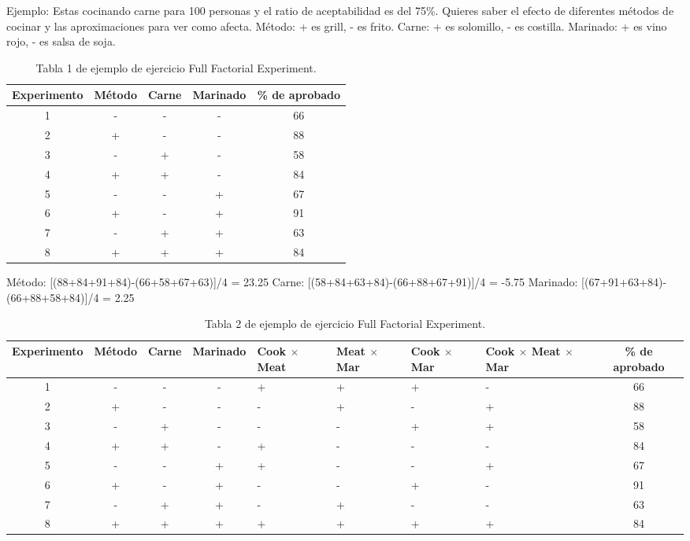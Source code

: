 \documentclass[]{article}
\begin{document}
Ejemplo: Estas cocinando carne para 100 personas y el ratio de aceptabilidad es del 75\%. Quieres saber el efecto de diferentes métodos de cocinar y las aproximaciones para ver como afecta.
Método: + es grill, - es frito. Carne: + es solomillo, - es costilla. Marinado: + es vino rojo, - es salsa de soja.

\begin{table}[H]
	\begin{center}
\begin{tabular}{|c|c|c|c|c|}
	\hline Experimento & Método & Carne & Marinado & \% de aprobado \\ 
	\hline 1 & - & - & - & 66 \\ 
	\hline 2 & + & - & - & 88 \\ 
	\hline 3 & - & + & - & 58 \\ 
	\hline 4 & + & + & - & 84 \\ 
	\hline 5 & - & - & + & 67 \\ 
	\hline 6 & + & - & + & 91 \\ 
	\hline 7 & - & + & + & 63 \\ 
	\hline 8 & + & + & + & 84 \\ 
	\hline 
\end{tabular} 
		\caption{Tabla 1 de ejemplo de ejercicio Full Factorial Experiment.}
		\end{center}
\end{table}

Método: [(88+84+91+84)-(66+58+67+63)]/4 = 23.25 \newline
Carne: [(58+84+63+84)-(66+88+67+91)]/4 = -5.75 \newline
Marinado: [(67+91+63+84)-(66+88+58+84)]/4 = 2.25


\begin{table}[H]
	\begin{center}
		\begin{tabular}{|c|c|c|c|p{1.5cm}|p{1.5cm}|p{1.5cm}|p{1.8cm}|c|}
			\hline Experimento & Método & Carne & Marinado & Cook $\times$ Meat & Meat $\times$ Mar & Cook $\times$ Mar & Cook $\times$ Meat $\times$ Mar & \% de aprobado \\ 
			\hline 1 & - & - & - & + & + & + & - & 66 \\ 
			\hline 2 & + & - & - & - & + & - & + & 88 \\ 
			\hline 3 & - & + & - & - & - & + & + & 58 \\ 
			\hline 4 & + & + & - & + & - & - & - & 84 \\ 
			\hline 5 & - & - & + & + & - & - & + & 67 \\ 
			\hline 6 & + & - & + & - & - & + & - & 91 \\ 
			\hline 7 & - & + & + & - & + & - & - & 63 \\ 
			\hline 8 & + & + & + & + & + & + & + & 84 \\ 
			\hline 
		\end{tabular} 
		\caption{Tabla 2 de ejemplo de ejercicio Full Factorial Experiment.}
	\end{center}
\end{table}
\end{document}
